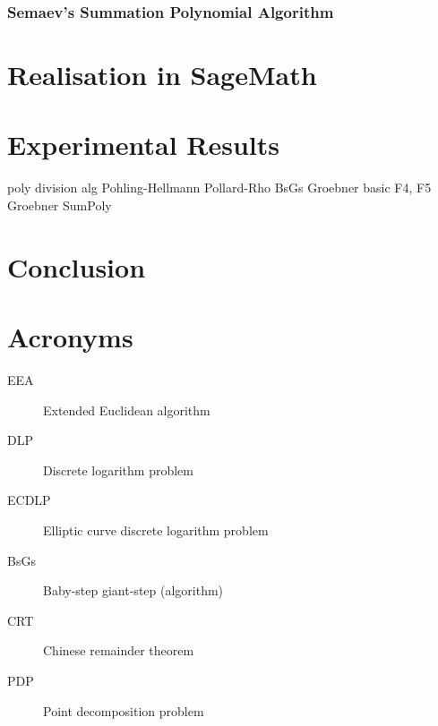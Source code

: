 \documentclass[thesis=M,english]{FITthesis}[2012/10/20]
\theoremstyle{remark}
\theoremstyle{definition}
\newtheorem{DF}{Definition}[section]
\begin{document}
\subsection{Semaev's Summation Polynomial Algorithm}


\chapter{Realisation in SageMath}

\chapter{Experimental Results}
\label{expResults}
poly division alg
Pohling-Hellmann
Pollard-Rho
BsGs
Groebner basic
F4, F5 Groebner
SumPoly 

\chapter{Conclusion}


%
%


\appendix

\chapter{Acronyms}
\begin{description}
	\item[EEA] Extended Euclidean algorithm
	\item[DLP] Discrete logarithm problem
	\item[ECDLP] Elliptic curve discrete logarithm problem
	\item[BsGs] Baby-step giant-step (algorithm)
	\item[CRT] Chinese remainder theorem
	\item[PDP] Point decomposition problem
\end{description}
\end{document}
